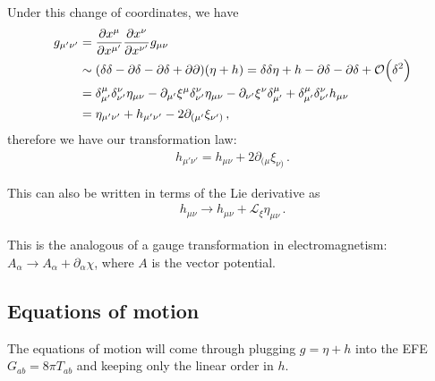 \documentclass[main.tex]{subfiles}
\begin{document}
Under this change of coordinates, we have 
%
\begin{align}
g_{\mu ' \nu '} &=
\pdv{x^{\mu }}{x^{\mu '}}
\pdv{x^{\nu }}{x^{\nu '}}
g_{\mu \nu }  \\
&\sim (\delta \delta - \partial \delta - \partial \delta + \partial \partial ) (\eta + h) = \delta \delta \eta + h - \partial \delta - \partial \delta  + \order{\delta^2 } \\ 
&= \delta^{\mu }_{\mu '} \delta^{\nu }_{\nu '} \eta_{\mu \nu } - \partial_{\mu '} \xi^{\mu } \delta^{\nu }_{\nu '} \eta_{\mu \nu } - \partial_{\nu '} \xi^{\nu } \delta^{\mu }_{\mu '} 
+ \delta^{\mu }_{\mu '} \delta^{\nu }_{\nu '} h_{\mu \nu }  \\
&= \eta_{\mu' \nu' } + h_{\mu ' \nu '} - 2 \partial_{(\mu '} \xi_{\nu ')}
\,,
\end{align}
%
therefore we have our transformation law: 
%
\begin{align}
h_{\mu' \nu' } = h_{\mu \nu } + 2 \partial_{(\mu } \xi_{\nu )}
\,.
\end{align}

This can also be written in terms of the Lie derivative as 
%
\begin{align}
h_{\mu \nu } \to h_{\mu \nu } + \mathscr{L}_{\xi } \eta_{\mu \nu }
\,.
\end{align}

This is the analogous of a gauge transformation in electromagnetism: \(A_{\alpha } \to A_{\alpha } + \partial_{\alpha } \chi \), where \(A\) is the vector potential. 

\subsection{Equations of motion}

The equations of motion will come through plugging \(g = \eta + h\) into the EFE \(G_{a b} = 8 \pi T_{ab}\) and keeping only the linear order in \(h\). 
\end{document}
